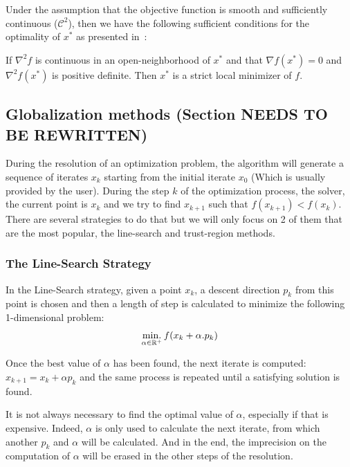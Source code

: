 Under the assumption that the objective function is smooth and sufficiently continuous ($\mathcal{C}^2$), then we have the following sufficient conditions for the optimality of $x^*$ as presented in~\cite{nocedal:book:2006}:

\begin{theorem}
  If $\nabla^2f$ is continuous in an open-neighborhood of $x^*$ and that $\nabla f(x^*)=0$ and $\nabla^2 f(x^*)$ is positive definite.
  Then $x^*$ is a strict local minimizer of $f$.
\label{optimalityTheorem}
\end{theorem}

\subsection{Globalization methods (Section NEEDS TO BE REWRITTEN)}

During the resolution of an optimization problem, the algorithm will generate a
sequence of iterates $x_k$ starting from the initial iterate $x_0$ (Which is
usually provided by the user). During the step $k$ of the optimization process,
the solver, the current point is $x_k$ and we try to find $x_{k+1}$ such that
$f(x_{k+1}) < f(x_k)$. There are several strategies to do that but we will only focus
on 2 of them that are the most popular, the line-search and trust-region
methods.

\subsubsection{The Line-Search Strategy}
In the Line-Search strategy, given a point $x_k$, a descent direction $p_k$ from this
point is chosen and then a length of step is calculated to minimize the
following 1-dimensional problem:
\begin{align}
  \operatorname*{min.}_{\alpha \in \mathbb{R}^+} f(x_k + \alpha.p_k)
\label{eq:lineSearchNLP}
\end{align}

Once the best value of $\alpha$ has been found, the next iterate is computed:
$x_{k+1} = x_{k} + \alpha p_k$ and the same process is repeated until a
satisfying solution is found.

It is not always necessary to find the optimal value of $\alpha$, especially if
that is expensive. Indeed, $\alpha$ is only used to calculate the next iterate,
from which another $p_k$ and $\alpha$ will be calculated. And in the end, the
imprecision on the computation of $\alpha$ will be erased in the other steps of
the resolution.

